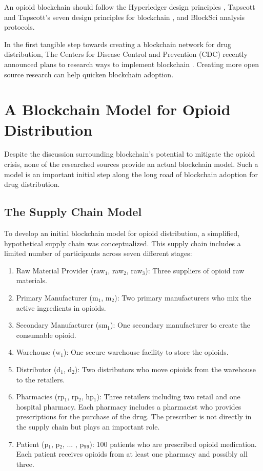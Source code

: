 \documentclass[sigconf]{acmart}
\begin{document}
An opioid blockchain should follow the Hyperledger design principles \cite{Cocco01} \cite{Hyperledger01}, Tapscott and Tapscott's seven design principles for blockchain \cite{tapscott}, and BlockSci \cite{Kalodner01} analysis protocols. 

In the first tangible step towards creating a blockchain network for drug distribution, The Centers for Disease Control and Prevention (CDC) recently announced plans to research ways to implement blockchain \cite{Orcutt01}. Creating more open source research can help quicken blockchain adoption. 





\section{A Blockchain Model for Opioid Distribution}
Despite the discussion surrounding blockchain's potential to mitigate the opioid crisis, none of the researched sources provide an actual blockchain model. Such a model is an important initial step along the long road of blockchain adoption for drug distribution. 

\subsection{The Supply Chain Model}
To develop an initial blockchain model for opioid distribution, a simplified, hypothetical supply chain was conceptualized. This supply chain includes a limited number of participants across seven different stages:
\begin{enumerate}
  \item Raw Material Provider (raw$_1$, raw$_2$, raw$_3$): Three suppliers of opioid raw materials.
  \item Primary Manufacturer (m$_1$, m$_2$): Two primary manufacturers who mix the active ingredients in opioids.
  \item Secondary Manufacturer (sm$_1$): One secondary manufacturer to create the consumable opioid.
  \item Warehouse (w$_1$): One secure warehouse facility to store the opioids.
  \item Distributor (d$_1$, d$_2$): Two distributors who move opioids from the warehouse to the retailers.
  \item Pharmacies (rp$_1$, rp$_2$, hp$_1$): Three retailers including two retail and one hospital pharmacy. Each pharmacy includes a pharmacist who provides prescriptions for the purchase of the drug. The prescriber is not directly in the supply chain but plays an important role.
  \item Patient (p$_1$, p$_2$, ... , p$_9{}_9$): 100 patients who are prescribed opioid medication. Each patient receives opioids from at least one pharmacy and possibly all three.
\end{enumerate}
\end{document}
